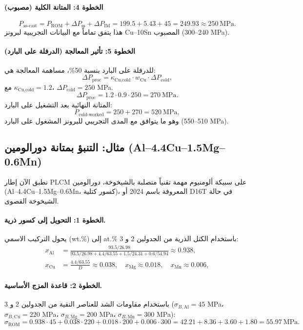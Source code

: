 \documentclass[11pt,a4paper]{article}
\begin{document}
\begin{otherlanguage}{arabic}
		\paragraph{الخطوة 4: المتانة الكلية (مصبوب)}
		\[
		P_{\text{as-cast}} = P_{\text{ROM}} + \Delta P_{\text{ss}} + \Delta P_{\text{IM}} = 199.5 + 5.43 + 45 = 249.93 \approx 250\ \text{MPa}.
		\]
		هذا يتفق تماماً مع البيانات التجريبية لبرونز Cu–10Sn المصبوب (240–300 MPa).
		
		\paragraph{الخطوة 5: تأثير المعالجة (الدرفلة على البارد)}
		للدرفلة على البارد بنسبة 50\%، مساهمة المعالجة هي:
		\[
		\Delta P_{\text{proc}} = \kappa_{\text{Cu,cold}} \cdot w_{\text{Cu}} \cdot \Delta P_{\text{cold}},
		\]
		مع \(\kappa_{\text{Cu,cold}} = 1.2\)، \(\Delta P_{\text{cold}} = 250\) MPa.
		\[
		\Delta P_{\text{proc}} = 1.2 \cdot 0.9 \cdot 250 = 270\ \text{MPa}.
		\]
		المتانة النهائية بعد التشغيل على البارد:
		\[
		P_{\text{cold-worked}} = 250 + 270 = 520\ \text{MPa},
		\]
		وهو ما يتوافق مع المدى التجريبي للبرونز المشغول على البارد (510–550 MPa).
		
		\subsection{مثال: التنبؤ بمتانة دورالومين (Al–4.4Cu–1.5Mg–0.6Mn)}
		\label{subsec:example-duralumin}
		
		نطبق الآن إطار PLCM على سبيكة ألومنيوم مهمة تقنياً متصلبة بالشيخوخة، دورالومين (Al–4.4Cu–1.5Mg–0.6Mn، كسور كتلية)، المعروفة باسم 2024 أو D16T في حالة الشيخوخة القصوى.
		
		\paragraph{الخطوة 1: التحويل إلى كسور ذرية.}
		يحول التركيب الاسمي (wt.\%) إلى at.\% باستخدام الكتل الذرية من الجدولين 2 و 3:
		\[
		\begin{aligned}
			x_{\mathrm{Al}} &= \frac{93.5/26.98}{93.5/26.98+4.4/63.55+1.5/24.31+0.6/54.94} \approx 0.938,\\
			x_{\mathrm{Cu}} &= \frac{4.4/63.55}{D} \approx 0.038,\quad
			x_{\mathrm{Mg}} \approx 0.018,\quad
			x_{\mathrm{Mn}} \approx 0.006,
		\end{aligned}
		\]
		
		\paragraph{الخطوة 2: قاعدة المزج الأساسية.}
		باستخدام مقاومات الشد للعناصر النقية من الجدولين 2 و 3 (\(\sigma_{B,\mathrm{Al}}=45\) MPa، \(\sigma_{B,\mathrm{Cu}}=220\) MPa، \(\sigma_{B,\mathrm{Mg}}=200\) MPa، \(\sigma_{B,\mathrm{Mn}}=300\) MPa):
		\[
		\sigma_{\mathrm{ROM}} = 0.938\cdot45 + 0.038\cdot220 + 0.018\cdot200 + 0.006\cdot300
		= 42.21 + 8.36 + 3.60 + 1.80 = 55.97\ \text{MPa}.
		\]
		

\end{otherlanguage}
\end{document}

